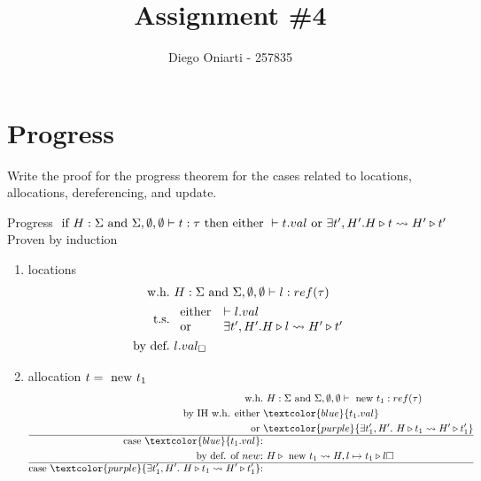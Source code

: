 \documentclass{article}
\title{Assignment \#4}
\author{Diego Oniarti - 257835}
\date{}
\begin{document}
\maketitle

\section{Progress}
Write the proof for the progress theorem for the cases related to locations, allocations, dereferencing, and update.
\begin{esempio}{Progress}
    $\text{ if } H:\Sigma\text{ and }\Sigma,\emptyset,\emptyset\vdash  t:\tau \text{ then } \text{either } \vdash t.val \text{ or } \exists t',H'.H\triangleright t \leadsto H'\triangleright t'$ \\
    Proven by induction
\end{esempio}
\begin{enumerate}
    \item locations
        \begin{align*}
            \text{w.h.} &\ H:\Sigma \AND \Sigma,\emptyset,\emptyset\vdash l:ref(\tau) \\
            \text{t.s.} &\ 
            \begin{array}{ll}
                \text{either}  & \vdash l.val \\
                \text{or}  & \exists t',H'. H\triangleright l \leadsto H'\triangleright t'
            \end{array} \\
            \text{by def.} &\ l.val_\square
        \end{align*}
    \item allocation $t=\text{ new } t_1$
        \begin{align*}
            \text{w.h.} &\ H:\Sigma\AND \Sigma,\emptyset,\emptyset\vdash \NEW t_1: ref(\tau) \\
            \text{by IH w.h. either }   & \textcolor{blue}{t_1.val}\\
            \OR                         & \textcolor{purple}{\exists t_1',H'.\ H\triangleright t_1 \leadsto H'\triangleright t_1'} \\
            \hline
            \text{case $\textcolor{blue}{t_1.val}$:} &\\
            \text{by def. of $new$:} &\ H\triangleright\NEW t_1 \leadsto H,l\mapsto t_1\triangleright l \square \\
            \hline
            \text{case $\textcolor{purple}{\exists t_1',H'.\ H\triangleright t_1 \leadsto H'\triangleright t_1'}$:} &\\

\end{align*}
\end{enumerate}
\end{document}
